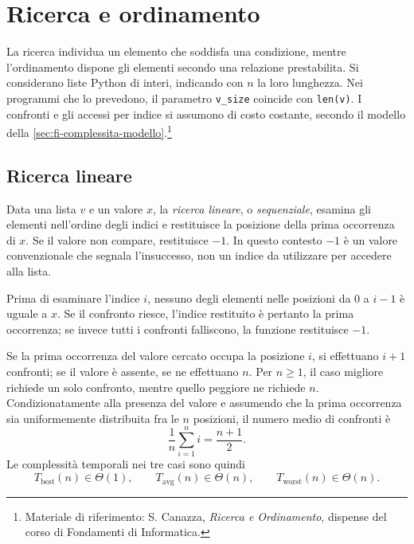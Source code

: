 \chapter{Ricerca e ordinamento}
\label{chap:ricerca-ordinamento}

La ricerca individua un elemento che soddisfa una condizione, mentre
l'ordinamento dispone gli elementi secondo una relazione prestabilita.
Si considerano liste Python di interi, indicando con \(n\) la loro
lunghezza. Nei programmi che lo prevedono, il parametro
\texttt{v\_size} coincide con \texttt{len(v)}. I confronti e gli
accessi per indice si assumono di costo costante, secondo il modello
della \cref{sec:fi-complessita-modello}.\footnote{Materiale
di riferimento: S. Canazza, \emph{Ricerca e Ordinamento}, dispense del
corso di Fondamenti di Informatica.}

\section{Ricerca lineare}
\label{sec:fi-ricerca-lineare}

Data una lista \(v\) e un valore \(x\), la \emph{ricerca lineare}, o
\emph{sequenziale}, esamina gli elementi nell'ordine degli indici e
restituisce la posizione della prima occorrenza di \(x\). Se il valore
non compare, restituisce \(-1\). In questo contesto \(-1\) è un valore
convenzionale che segnala l'insuccesso, non un indice da utilizzare
per accedere alla lista.



Prima di esaminare l'indice \(i\), nessuno degli elementi nelle
posizioni da \(0\) a \(i-1\) è uguale a \(x\). Se il confronto riesce,
l'indice restituito è pertanto la prima occorrenza; se invece tutti
i confronti falliscono, la funzione restituisce \(-1\).

Se la prima occorrenza del valore cercato occupa la posizione \(i\),
si effettuano \(i+1\) confronti; se il valore è assente, se ne
effettuano \(n\). Per \(n\ge1\), il caso migliore richiede un solo
confronto, mentre quello peggiore ne richiede \(n\).
Condizionatamente alla presenza del valore e assumendo che la prima
occorrenza sia uniformemente distribuita fra le \(n\) posizioni,
il numero medio di confronti è
\[
  \frac{1}{n}\sum_{i=1}^{n}i=\frac{n+1}{2}.
\]
Le complessità temporali nei tre casi sono quindi
\[
  T_{\mathrm{best}}(n)\in\Theta(1),\qquad
  T_{\mathrm{avg}}(n)\in\Theta(n),\qquad
  T_{\mathrm{worst}}(n)\in\Theta(n).
\]


